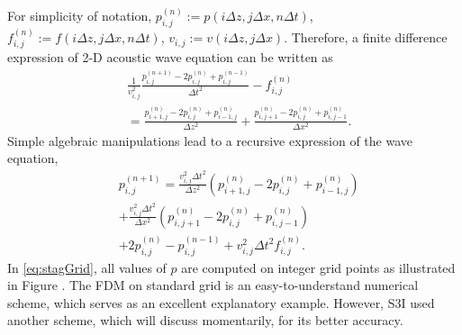 \documentclass[11pt,titlepage]{article}
\theoremstyle{plain}
\theoremstyle{definition}
\theoremstyle{remark}
\numberwithin{equation}{section}
\begin{document}
For simplicity of notation, $p_{i,j}^{(n)}:=  p(i\Delta z, j\Delta x, n\Delta t)$, $f_{i,j}^{(n)} := f(i\Delta z, j\Delta x, n\Delta t)$, $v_{i,j} := v(i\Delta z, j\Delta x)$. Therefore, a finite difference expression of 2-D acoustic wave equation can be written as 
  \begin{equation}
    \begin{aligned}
    &\frac{1}{v_{i,j}^2}\frac{p_{i,j}^{(n+1)} - 2p_{i,j}^{(n)} + p_{i,j}^{(n-1)}}{\Delta t^2} - f_{i,j}^{(n)}\\
    &= \frac{p_{i+1,j}^{(n)} - 2p_{i,j}^{(n)} + p_{i-1,j}^{(n)}}{\Delta z^2} + \frac{p_{i,j+1}^{(n)} - 2p_{i,j}^{(n)} + p_{i,j-1}^{(n)}}{\Delta x^2}.
    \end{aligned}
  \end{equation}
Simple algebraic manipulations lead to a recursive expression of the wave equation,
  \begin{equation}
  \label{eq:stagGrid}
    \begin{aligned}
    &p_{i,j}^{(n+1)} = \frac{v_{i,j}^2\Delta t^2}{\Delta z^2}\left(p_{i+1,j}^{(n)} - 2p_{i,j}^{(n)} + p_{i-1,j}^{(n)}\right)\\
    &+ \frac{v_{i,j}^2\Delta t^2}{\Delta x^2}\left(p_{i,j+1}^{(n)} - 2p_{i,j}^{(n)} + p_{i,j-1}^{(n)}\right)\\
    &+ 2p_{i,j}^{(n)}-p_{i,j}^{(n-1)} + v_{i,j}^2\Delta t^2 f_{i,j}^{(n)}.
    \end{aligned}
  \end{equation}
  In \eqref{eq:stagGrid}, all values of $p$ are computed on integer grid points as illustrated in Figure . The FDM on standard grid is an easy-to-understand numerical scheme, which serves as an excellent explanatory example. However, S3I used another scheme, which will discuss momentarily, for its better accuracy.  
  
\end{document}
